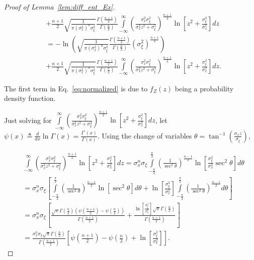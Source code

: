 \documentclass[12pt,onecolumn, margin=1in]{IEEEtran}
\newcommand{\bracket}[1]{\left[ #1 \right]}
\newcommand{\paren}[1]{\left( #1 \right)}
\newcommand{\sigx}{\sigma_x}
\newcommand{\sigxi}{\sigma_\xi}
\begin{document}
\begin{proof}[Proof of Lemma~\ref{lem:diff_ent_Ex}]
\begin{align}
     &+ \frac{n + 1}{2}\sqrt{\frac{1}{\pi\paren{\sigx^2}^n\sigxi^2}}\frac{\Gamma\paren{\frac{n+1}{2}}}{\Gamma\paren{\frac{n}{2}}}\int\limits_{-\infty}^\infty \paren{\frac{\sigx^2\sigxi^2}{\sigx^2z^2 + \sigxi^2}}^{\frac{n + 1}{2}}\ln\bracket{z^2 + \frac{\sigxi^2}{\sigx^2}}dz\\
     &= - \ln{\paren{\sqrt{\frac{1}{\pi\paren{\sigx^2}^n\sigxi^2}}\frac{\Gamma\paren{\frac{n+1}{2}}}{\Gamma\paren{\frac{n}{2}}}\paren{\sigxi^2}^{\frac{n + 1}{2}}}}\nonumber\\
     &+ \frac{n + 1}{2}\sqrt{\frac{1}{\pi\paren{\sigx^2}^n\sigxi^2}}\frac{\Gamma\paren{\frac{n+1}{2}}}{\Gamma\paren{\frac{n}{2}}}\int\limits_{-\infty}^\infty \paren{\frac{\sigx^2\sigxi^2}{\sigx^2z^2 + \sigxi^2}}^{\frac{n + 1}{2}}\ln\bracket{z^2 + \frac{\sigxi^2}{\sigx^2}}dz.\label{eq:normalized}
\end{align}

The first term in Eq.~\eqref{eq:normalized} is due to $f_Z(z)$ being a probability density function.

Just solving for $\int\limits_{-\infty}^\infty \paren{\frac{\sigx^2\sigxi^2}{\sigx^2z^2 + \sigxi^2}}^{\frac{n + 1}{2}}\ln\bracket{z^2 + \frac{\sigxi^2}{\sigx^2}}dz$, let $\psi(x) \triangleq \frac{d}{dx}\ln{\Gamma(x)} = \frac{\Gamma^\prime(x)}{\Gamma(x)}$. Using the change of variables $\theta = \tan^{-1}(\frac{\sigx z}{\sigxi})$,


\begin{align}
    &\int\limits_{-\infty}^\infty \paren{\frac{\sigx^2\sigxi^2}{\sigx^2z^2 + \sigxi^2}}^{\frac{n + 1}{2}}\ln\bracket{z^2 + \frac{\sigxi^2}{\sigx^2}}dz = \sigx^n\sigxi\int\limits_{-\frac{\pi}{2}}^\frac{\pi}{2} \paren{\frac{1}{\sec^2{\theta}}}^{\frac{n - 1}{2}}\ln\bracket{\frac{\sigxi^2}{\sigx^2}\sec^2\theta}d\theta\\
    &=  \sigx^n\sigxi\bracket{\int\limits_{-\frac{\pi}{2}}^\frac{\pi}{2} \paren{\frac{1}{\sec^2{\theta}}}^{\frac{n-1}{2}}\ln\bracket{\sec^2\theta}d\theta + \ln\bracket{\frac{\sigxi^2}{\sigx^2}}\int\limits_{-\frac{\pi}{2}}^\frac{\pi}{2} \paren{\frac{1}{\sec^2{\theta}}}^{\frac{n-1}{2}}d\theta}\\
    &=  \sigx^n\sigxi\bracket{\frac{\sqrt{\pi}\Gamma\paren{\frac{n}{2}}\paren{\psi\paren{\frac{n+1}{2}} - \psi\paren{\frac{n}{2}}}}{\Gamma\paren{\frac{n+1}{2}}}  + \frac{\ln\bracket{\frac{\sigxi^2}{\sigx^2}}\sqrt{\pi}\Gamma\paren{\frac{n}{2}}  }{\Gamma\paren{\frac{n+1}{2}}}}\\
    &= \frac{ \sigx^n\sigxi\sqrt{\pi}\Gamma\paren{\frac{n}{2}}}{\Gamma\paren{\frac{n+1}{2}}}\bracket{\psi\paren{\frac{n+1}{2}} - \psi\paren{\frac{n}{2}} + \ln\bracket{\frac{\sigxi^2}{\sigx^2}}}.
\end{align}


\end{proof}
\end{document}
